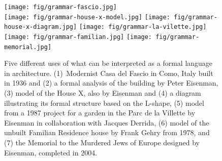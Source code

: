 %
%
%
%
%
%
%
%
%
%
%
%

\begin{figure}[t]
\vspace{-1em}
\texttt{[image: fig/grammar-fascio.jpg]}\quad
{}\\[1em]
\texttt{[image: fig/grammar-house-x-model.jpg]}\quad
\texttt{[image: fig/grammar-house-x-diagram.jpg]}\quad
\texttt{[image: fig/grammar-la-vilette.jpg]}\\[1em]
\texttt{[image: fig/grammar-familian.jpg]}\quad
\texttt{[image: fig/grammar-memorial.jpg]}
\caption{Five different uses of what can be interpreted as a formal language in architecture.
(1)~Modernist Casa del Fascio in Como, Italy built in 1936 and (2) a formal analysis of the building
by Peter Eisenman, (3) model of the House X, also by Eisenman and (4) a diagram illustrating
its formal structure based on the L-shape, (5) model from a 1987 project for a garden in the
Parc de la Villette by Eisenman in collaboration with Jacques Derrida, (6) model of the unbuilt
Familian Residence house by Frank Gehry from 1978, and (7) the Memorial to the Murdered Jews of
Europe designed by Eisenman, completed in 2004.}
\label{fig:grammar}
\vspace{-0.5em}
\end{figure}

